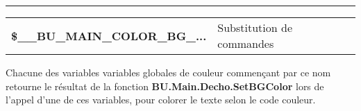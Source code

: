 \documentclass[a4paper,10pt]{article}
\begin{document}

\par\noindent\rule{\textwidth}{0.4pt}

\begin{justify}
    \begin{tabular}{l|l}
        \textbf{\color{vars}\$\_\_BU\_MAIN\_COLOR\_BG\_...} & Substitution de commandes\\
    \end{tabular}
\end{justify}

\begin{justify}
    Chacune des variables variables globales de couleur commençant par ce nom retourne le résultat de la fonction \textbf{\color{func}BU.Main.Decho.SetBGColor} lors de l'appel d'une de ces variables, pour colorer le texte selon le code couleur.
\end{justify}
\end{document}
